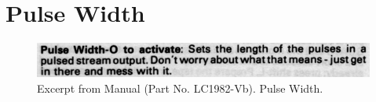 \chapter{Pulse Width} 
\lstset{style=6502Style}

\begin{figure}[H]
    \centering
    \begin{adjustbox}{width=10.5cm,margin=0cm}
      \includegraphics[width=12cm]{src/pulsewidth/pulsewidth.png}%
    \end{adjustbox}
    \caption{
      Excerpt from Manual (Part No. LC1982-Vb). Pulse Width.
      }
\end{figure}

